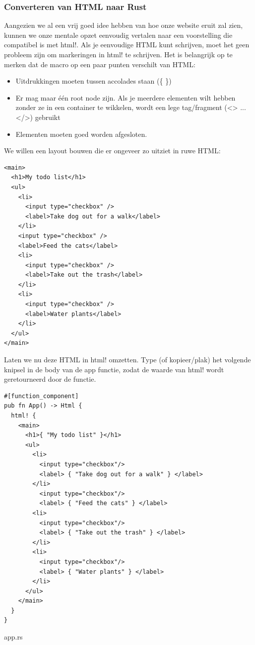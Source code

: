 \clearpage

\subsubsection{Converteren van HTML naar Rust}

Aangezien we al een vrij goed idee hebben van hoe onze website eruit zal zien, kunnen we onze
mentale opzet eenvoudig vertalen naar een voorstelling die compatibel is met html!. Als je
eenvoudige HTML kunt schrijven, moet het geen probleem zijn om markeringen in html! te schrijven.
Het is belangrijk op te merken dat de macro op een paar punten verschilt van HTML:
\begin{itemize}
  \item Uitdrukkingen moeten tussen accolades staan (\{ \})
  \item Er mag maar één root node zijn. Als je
    meerdere elementen wilt hebben zonder ze in een container te wikkelen, wordt een lege
    tag/fragment (<> ... </>) gebruikt
  \item Elementen moeten goed worden afgesloten.
\end{itemize}

We willen een layout bouwen die er ongeveer zo uitziet in ruwe HTML:

\begin{verbatim}
<main>
  <h1>My todo list</h1>
  <ul>
    <li>
      <input type="checkbox" />
      <label>Take dog out for a walk</label>
    </li>
    <input type="checkbox" />
    <label>Feed the cats</label>
    <li>
      <input type="checkbox" />
      <label>Take out the trash</label>
    </li>
    <li>
      <input type="checkbox" />
      <label>Water plants</label>
    </li>
  </ul>
</main>
\end{verbatim}

\clearpage

Laten we nu deze HTML in html! omzetten. Type (of kopieer/plak) het volgende knipsel in de body van
de app functie, zodat de waarde van html! wordt geretourneerd door de functie.

\begin{listing}[h]
\begin{verbatim}
#[function_component]
pub fn App() -> Html {
  html! {
    <main>
      <h1>{ "My todo list" }</h1>
      <ul>
        <li>
          <input type="checkbox"/>
          <label> { "Take dog out for a walk" } </label>
        </li>
          <input type="checkbox"/>
          <label> { "Feed the cats" } </label>
        <li>
          <input type="checkbox"/>
          <label> { "Take out the trash" } </label>
        </li>
        <li>
          <input type="checkbox"/>
          <label> { "Water plants" } </label>
        </li>
      </ul>
    </main>
  }
}
\end{verbatim}
\caption{app.rs}
\end{listing}

